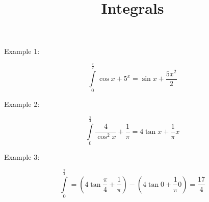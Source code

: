 \documentclass{article}
\title{Integrals}
\begin{document}
\maketitle

\begin{center}
	Example 1:
\end{center}

\begin{equation}
	\int\limits_{0}^{\frac{\pi}{2}} \cos{x} + 5^{x} = \sin{x} + \frac{5x^{2}}{2}
\end{equation}

\begin{center}
	Example 2:
\end{center}

\begin{equation}
	\int\limits_{0}^{\frac{\pi}{4}} \frac{4}{\cos^{2}{x}} + \frac{1}{\pi} = 4 \tan{x} + \frac{1}{\pi}x
\end{equation}

\begin{center}
	Example 3:
\end{center}

\begin{equation}
	\int\limits_{0}^{\frac{\pi}{4}} = (4\tan{\frac{\pi}{4}}+\frac{1}{\pi}) - (4 \tan{0} + \frac{1}{\pi}0) = \frac{17}{4}
\end{equation}
\end{document}
